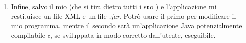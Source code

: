 \begin{enumerate}
	\item Infine, salvo il mio  (che si tira dietro tutti i suo ) e l'applicazione mi restituisce un file XML e un file \emph{.jar}. Potrò usare il primo per modificare il mio programma, mentre il secondo sarà un'applicazione Java potenzialmente compilabile e, se sviluppata in modo corretto dall'utente, eseguibile.
\end{enumerate}



